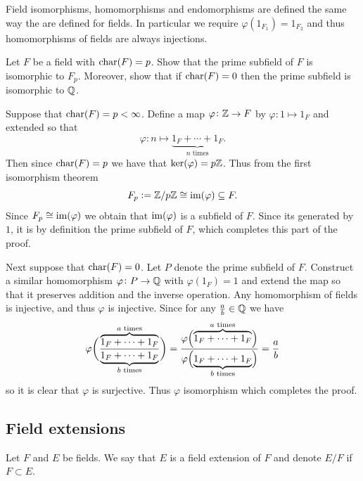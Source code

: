 \documentclass[11pt,a4paper]{article}
\begin{document}
\begin{remark}
  Field isomorphisms, homomorphisms and endomorphisms are defined the same
  way the are defined for fields.
  In particular we require $\varphi(1_{F_1}) = 1_{F_2}$ and thus
  homomorphisms of fields are always injections.
\end{remark}

\begin{exercise}
  Let $F$ be a field with $\text{char}(F) = p$.
  Show that the prime subfield of $F$ is isomorphic to $F_p$.
  Moreover, show that if $\text{char}(F) = 0$ then the prime subfield
  is isomorphic to $\mathbb{Q}$.
\end{exercise}
\begin{solution}
  Suppose that $\text{char}(F) = p < \infty$.
  Define a map $\varphi \colon \mathbb{Z} \to F$ by
  $\varphi \colon 1 \mapsto 1_F$ and extended so that
  \[
    \varphi \colon n \mapsto \underbrace{1_F + \cdots + 1_F}_{n \text{ times}}.
  \]
  Then since $\text{char}(F) = p$ we have that $\ker(\varphi) = p\mathbb{Z}$.
  Thus from the first isomorphism theorem
  \[
    F_p := \mathbb{Z}/p\mathbb{Z} \cong \operatorname{im}(\varphi) \subseteq F.
  \]
  Since $F_p \cong \operatorname{im}(\varphi)$ we obtain that $\operatorname{im}(\varphi)$ is a subfield
  of $F$.
  Since its generated by $1$, it is by definition the prime subfield of $F$,
  which completes this part of the proof.
  
  Next suppose that $\text{char}(F) = 0$.
  Let $P$ denote the prime subfield of $F$.
  Construct a similar homomorphism
  $\varphi \colon P \to \mathbb{Q}$ with $\varphi(1_F) = 1$
  and extend the map so that it preserves addition and the inverse operation.
  Any homomorphism of fields is injective, and thus $\varphi$ is injective.
  Since for any $\frac{a}{b} \in \mathbb{Q}$ we have
  \[
    \varphi\del[4]{\frac{\overbrace{1_F + \cdots + 1_F}^{a \text{ times}}}{\underbrace{1_F + \cdots + 1_F}_{b \text{ times}}}} =
    \frac{\varphi\del[2]{\overbrace{1_F + \cdots + 1_F}^{a \text{ times}}}}{\varphi\del[2]{\underbrace{1_F + \cdots + 1_F}_{b \text{ times}}}} =
    \frac{a}{b}
  \]
  so it is clear that $\varphi$ is surjective.
  Thus $\varphi$ isomorphism which completes the proof.
\end{solution}

\subsection{Field extensions}
\begin{definition}
  Let $F$ and $E$ be fields.
  We say that $E$ is a field extension of $F$ and denote $E/F$ if
  $F \subset E$.
\end{definition}
\end{document}
